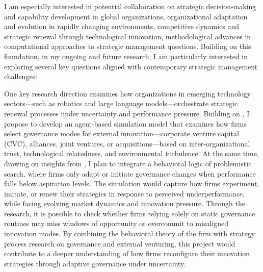 \documentclass[11pt,a4paper]{article}
\begin{document}
I am especially interested in potential collaboration on strategic decision-making and capability development in global organizations, organizational adaptation and evolution in rapidly changing environments, 
competitive dynamics and strategic renewal through technological innovation, 
methodological advances in computational approaches to strategic management questions.
Building on this foundation, in my ongoing and future research, I am particularly interested in exploring several key questions aligned with contemporary strategic management challenges:

One key research direction examines how organizations in emerging technology sectors—such as robotics and large language models—orchestrate strategic renewal processes under uncertainty and performance pressure.
Building on \textcite{Keil2008ThePerformance}, I propose to develop an agent-based simulation model that examines how firms select governance modes for external innovation—corporate venture capital (CVC), alliances, joint ventures, or acquisitions—based on inter-organizational trust, technological relatedness, and environmental turbulence. 
At the same time, drawing on insights from \textcite{Posen2017RenewingAgenda}, I plan to integrate a behavioral logic of problemistic search, where firms only adapt or initiate governance changes when performance falls below aspiration levels. 
The simulation would capture how firms experiment, imitate, or renew their strategies in response to perceived underperformance, while facing evolving market dynamics and innovation pressure. 
Through the research, it is possible to check whether firms relying solely on static governance routines may miss windows of opportunity or overcommit to misaligned innovation modes. 
By combining the behavioral theory of the firm with strategy process research on governance and external venturing, this project would contribute to a deeper understanding of how firms reconfigure their innovation strategies through adaptive governance under uncertainty.
\end{document}
